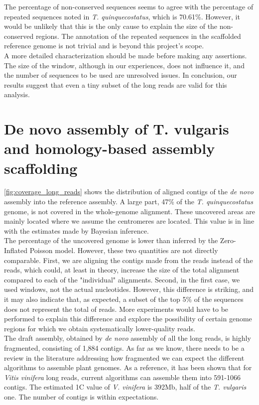 The percentage of non-conserved sequences seems to agree with the percentage of repeated sequences noted in \textit{T. quinquecostatus}, which is 70.61\%\cite{sunChromosomelevelAssemblyAnalysis2022}. However, it would be unlikely that this is the only cause to explain the size of the non-conserved regions. The annotation of the repeated sequences in the scaffolded reference genome is not trivial and is beyond this project's scope. \\

A more detailed characterization should be made before making any assertions. The size of the window, although in our experiences, does not influence it, and the number of sequences to be used are unresolved issues. In conclusion, our results suggest that even a tiny subset of the long reads are valid for this analysis.

\section*{De novo assembly of T. vulgaris and homology-based assembly scaffolding}

\autoref{fig:coverage_long_reads} shows the distribution of aligned contigs of the \textit{de novo} assembly into the reference assembly.  A large part, 47\% of the \textit{T. quinquecostatus} genome, is not covered in the whole-genome alignment. These uncovered areas are mainly located where we assume the centromeres are located. This value is in line with the estimates made by Bayesian inference.\\

The percentage of the uncovered genome is lower than inferred by the Zero-Inflated Poisson model. However, these two quantities are not directly comparable. First, we are aligning the contigs made from the reads instead of the reads, which could, at least in theory,  increase the size of the total alignment compared to each of the "individual" alignments. Second, in the first case, we used windows, not the actual nucleotides. However, this difference is striking, and it may also indicate that, as expected, a subset of the top 5\% of the sequences does not represent the total of reads. More experiments would have to be performed to explain this difference and explore the possibility of certain genome regions for which we obtain systematically lower-quality reads.\\

The draft assembly, obtained by \textit{de novo} assembly of all the long reads, is highly fragmented, consisting of 1,884 contigs. As far as we know, there needs to be a review in the literature addressing how fragmented we can expect the different algorithms to assemble plant genomes. As a reference, it has been shown that for \textit{Vitis vinifera} long reads, current algorithms can assemble them into 591-1066 contigs. The estimated 1C value of \textit{V. vinifera} is 392Mb, half of the \textit{T. vulgaris} one. The number of contigs is within expectations.\\

